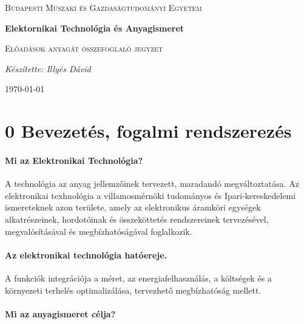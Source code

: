 \documentclass[11pt]{article}
\begin{document}
\begin{titlepage}
	\centering \vfill
	{\textsc{Budapesti Műszaki és Gazdaságtudományi Egyetem} \par} \vspace{7cm}
	{\huge\bfseries Elektornikai Technológia és Anyagismeret\par} \vspace{0.5cm}
	{\large \textsc{Előadások anyagát összefoglaló jegyzet}\par} \vspace{1.5cm}
	{\Large\itshape Készítette: Illyés Dávid\par} \vfill

	\noindent{}
	
	\vfill {\large \today\par}
\end{titlepage} 
\tableofcontents
{}

    \section{0 Bevezetés, fogalmi rendszerezés}

        \paragraph{Mi az Elektronikai Technológia?} A technológia az anyag jellemzőinek tervezett, maradandó megváltoztatása. Az elektronikai texhnológia a villamosmérnöki tudományos és Ipari-kereskedelemi ismereteknek azon területe, amely az elektronikus áramköri egységek alkatrészeinek, hordotóinak és összeköttetés rendszereinek tervezésével, megvalósításával és megbízhatóságával foglalkozik.

		\paragraph{Az elektronikai technológia hatóereje.} A funkciók integrációja a méret, az energiafelhasználás, a költségek és a környezeti terhelés optimalizálása, tervezhető megbízhatóság mellett.

		\paragraph{Mi az anyagismeret célja?}
\end{document}
